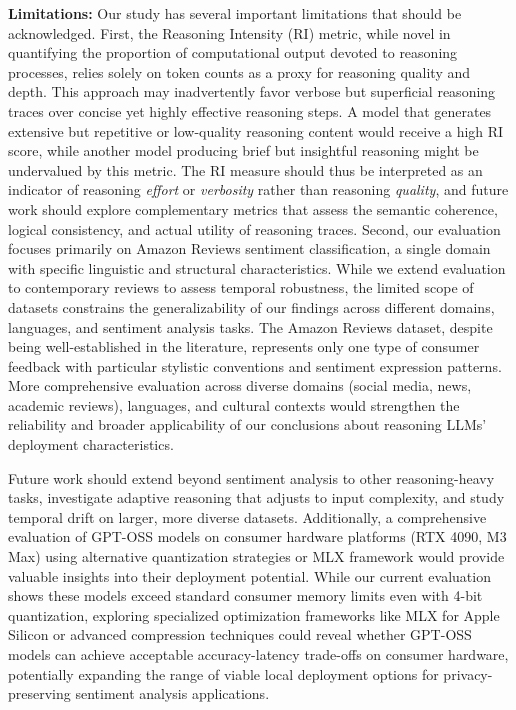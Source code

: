 \documentclass[conference]{IEEEtran}
\begin{document}
\textbf{Limitations:} Our study has several important limitations that should be acknowledged. First, the Reasoning Intensity (RI) metric, while novel in quantifying the proportion of computational output devoted to reasoning processes, relies solely on token counts as a proxy for reasoning quality and depth. This approach may inadvertently favor verbose but superficial reasoning traces over concise yet highly effective reasoning steps. A model that generates extensive but repetitive or low-quality reasoning content would receive a high RI score, while another model producing brief but insightful reasoning might be undervalued by this metric. The RI measure should thus be interpreted as an indicator of reasoning \textit{effort} or \textit{verbosity} rather than reasoning \textit{quality}, and future work should explore complementary metrics that assess the semantic coherence, logical consistency, and actual utility of reasoning traces. Second, our evaluation focuses primarily on Amazon Reviews sentiment classification, a single domain with specific linguistic and structural characteristics. While we extend evaluation to contemporary reviews to assess temporal robustness, the limited scope of datasets constrains the generalizability of our findings across different domains, languages, and sentiment analysis tasks. The Amazon Reviews dataset, despite being well-established in the literature, represents only one type of consumer feedback with particular stylistic conventions and sentiment expression patterns. More comprehensive evaluation across diverse domains (social media, news, academic reviews), languages, and cultural contexts would strengthen the reliability and broader applicability of our conclusions about reasoning LLMs' deployment characteristics.

Future work should extend beyond sentiment analysis to other reasoning-heavy tasks, investigate adaptive reasoning that adjusts to input complexity, and study temporal drift on larger, more diverse datasets. Additionally, a comprehensive evaluation of GPT-OSS models on consumer hardware platforms (RTX 4090, M3 Max) using alternative quantization strategies or MLX framework would provide valuable insights into their deployment potential. While our current evaluation shows these models exceed standard consumer memory limits even with 4-bit quantization, exploring specialized optimization frameworks like MLX for Apple Silicon or advanced compression techniques could reveal whether GPT-OSS models can achieve acceptable accuracy-latency trade-offs on consumer hardware, potentially expanding the range of viable local deployment options for privacy-preserving sentiment analysis applications.
\end{document}
